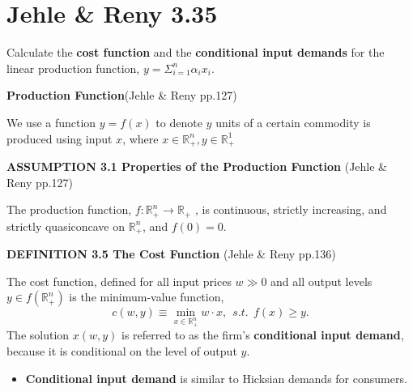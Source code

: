 \documentclass{article}
\newcommand{\R}{\mathbb{R}}
\begin{document}

\section{Jehle \& Reny 3.35}

Calculate the \textbf{cost function} and the \textbf{conditional input demands} for the linear production function,
$y = \Sigma^n_{i=1} \alpha_i x_i$.

\begin{mdframed}[backgroundcolor=blue!20,linecolor=white]

\textbf{Production Function}(Jehle \& Reny pp.127)

We use a function $y = f(x)$ to denote $y$ units of a certain commodity is produced using input $x$, where $x \in \R^n_+, y \in \R^1_+$

\vspace{2mm}

\textbf{ASSUMPTION 3.1 Properties of the Production Function} (Jehle \& Reny pp.127)

The production function, $f : \R^n_+ \to \R_+$ , is continuous, strictly increasing, and strictly
quasiconcave on $\R^n_+$, and $f (0) = 0$.

\vspace{2mm}

\textbf{DEFINITION 3.5 The Cost Function} (Jehle \& Reny pp.136)

The cost function, defined for all input prices $w \gg 0$ and all output levels $y \in f(\R^n_+)$ is the
minimum-value function,
$$c(w,y) \equiv \min_{x \in \R^n_+} w \cdot x , \ \ s.t. \ \ f(x) \ge y.$$
The solution $x(w, y)$ is referred to as the firm’s \textbf{conditional input demand}, because it is conditional on the level of output $y$.

\begin{itemize}
\item  \textbf{Conditional input demand} is similar to Hicksian demands for consumers.
\end{itemize}

\end{mdframed}

\vspace{2mm}
\end{document}
